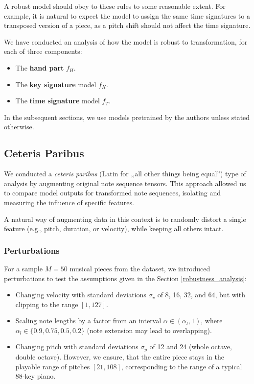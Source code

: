 A robust model should obey to these rules to some reasonable extent. For example, it is natural  to expect the model to assign the same time signatures to a transposed version of a piece, as a pitch shift should not affect the time signature.

We have conducted an analysis of how the model is robust to transformation, for each of three components: \begin{itemize}
	\item The \textbf{hand part} $f_H$.
	\item The \textbf{key signature} model $f_K$.
	\item The \textbf{time signature} model $f_T$.
\end{itemize} In the subsequent sections, we use models pretrained by the authors unless stated otherwise.

\subsection{Ceteris Paribus}

We conducted a \emph{ceteris paribus} (Latin for ,,all other things being equal'') type of analysis by augmenting original note sequence tensors. This approach allowed us to compare model outputs for transformed note sequences, isolating and measuring the influence of specific features.

A natural way of augmenting data in this context is to randomly distort a single feature (e.g., pitch, duration, or velocity), while keeping all others intact.

\subsubsection{Perturbations} \label{perturbations}

For a sample $M = 50$ musical pieces from the dataset, we introduced perturbations to test the assumptions given in the Section \ref{robustness_analysis}: \begin{itemize}
	\item Changing velocity with standard deviations $\sigma_v$ of 8, 16, 32, and 64, but with clipping to the range $[1, 127]$.
	\item Scaling note lengths by a factor from an interval $\alpha\in(\alpha_l,1)$, where $\alpha_l\in\{0.9, 0.75, 0.5, 0.2\}$ (note extension may lead to overlapping).
	\item Changing pitch with standard deviations $\sigma_p$ of 12 and 24 (whole octave, double octave). However, we ensure, that the entire piece stays in the playable range of pitches $[21, 108]$, corresponding to the range of a typical $88$-key piano.
\end{itemize}

